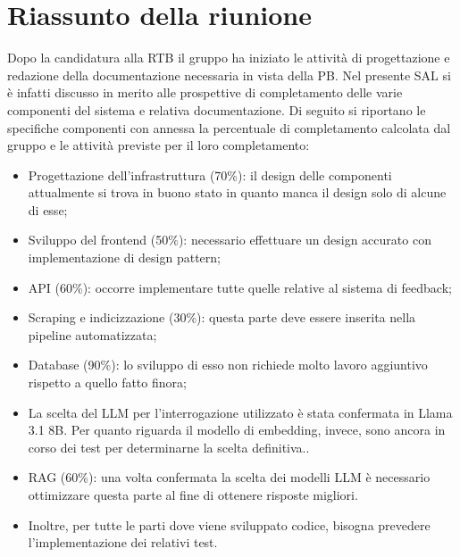 \section{Riassunto della riunione}
Dopo la candidatura alla RTB il gruppo ha iniziato le attività di progettazione e redazione della documentazione necessaria in vista della PB. Nel presente SAL si è infatti discusso in merito alle prospettive di completamento delle varie componenti del sistema e relativa documentazione. Di seguito si riportano le specifiche componenti con annessa la percentuale di completamento calcolata dal gruppo e le attività previste per il loro completamento:
\begin{itemize}
    \item Progettazione dell'infrastruttura (70\%): il design delle componenti attualmente si trova in buono stato in quanto manca il design solo di alcune di esse;
    \item Sviluppo del frontend (50\%): necessario effettuare un design accurato con implementazione di design pattern;
    \item API (60\%): occorre implementare tutte quelle relative al sistema di feedback;
    \item Scraping e indicizzazione (30\%): questa parte deve essere inserita nella pipeline automatizzata;
    \item Database (90\%): lo sviluppo di esso non richiede molto lavoro aggiuntivo rispetto a quello fatto finora;
    \item La scelta del LLM per l'interrogazione utilizzato è stata confermata in Llama 3.1 8B. Per quanto riguarda il modello di embedding, invece, sono ancora in corso dei test per determinarne la scelta definitiva..
    \item RAG (60\%): una volta confermata la scelta dei modelli LLM è necessario ottimizzare questa parte al fine di ottenere risposte migliori.
    \item Inoltre, per tutte le parti dove viene sviluppato codice, bisogna prevedere l'implementazione dei relativi test.
\end{itemize}
